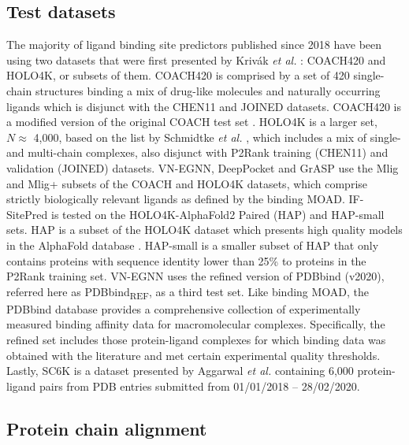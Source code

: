 \subsection{Test datasets}

The majority of ligand binding site predictors published since 2018 have been using two datasets that were first presented by Krivák \textit{et al.} \cite{KRIVAK_2018_P2RANK}: COACH420 and HOLO4K, or subsets of them. COACH420 is comprised by a set of 420 single-chain structures binding a mix of drug-like molecules and naturally occurring ligands which is disjunct with the CHEN11 and JOINED datasets. COACH420 is a modified version of the original COACH test set \cite{ROY_2012_COFACTOR, YANG_2013_COFACTOR}. HOLO4K is a larger set, $N \approx$ 4,000, based on the list by Schmidtke \textit{et al.} \cite{SCHMIDTKE_2010_FPOCKET}, which includes a mix of single- and multi-chain complexes, also disjunct with P2Rank training (CHEN11) and validation (JOINED) datasets. VN-EGNN, DeepPocket and GrASP use the Mlig and Mlig+ subsets of the COACH and HOLO4K datasets, which comprise strictly biologically relevant ligands as defined by the binding MOAD. IF-SitePred is tested on the HOLO4K-AlphaFold2 Paired (HAP) and HAP-small sets. HAP is a subset of the HOLO4K dataset which presents high quality models in the AlphaFold database \cite{VARADI_2022_ALPHAFOLDDB}. HAP-small is a smaller subset of HAP that only contains proteins with sequence identity lower than 25\% to proteins in the P2Rank training set. VN-EGNN uses the refined version of PDBbind (v2020), referred here as PDBbind\textsubscript{REF}, \cite{WANG_2004_PDBBIND, WANG_2005_PDBBIND, CHENG_2009_PDBBIND, LI_2014_PDBBIND, LIU_2015_PDBBIND, LIU_2017_PDBBIND} as a third test set. Like binding MOAD, the PDBbind database provides a comprehensive collection of experimentally measured binding affinity data for macromolecular complexes. Specifically, the refined set includes those protein-ligand complexes for which binding data was obtained with the literature and met certain experimental quality thresholds. Lastly, SC6K is a dataset presented by Aggarwal \textit{et al.} \cite{AGGARWAL_2022_DEEPPOCKET} containing 6,000 protein-ligand pairs from PDB entries submitted from 01/01/2018 – 28/02/2020. 

\subsection{Protein chain alignment}

